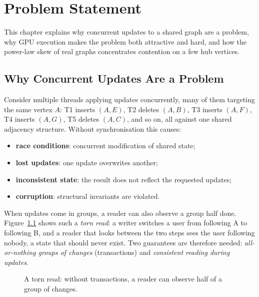 \documentclass[11pt,a4paper,oneside]{report}
\begin{document}
\chapter{Problem Statement}
\label{ch:problem}
This chapter explains why concurrent updates to a shared graph are a problem, why GPU execution makes the problem both
attractive and hard, and how the power-law skew of real graphs concentrates contention on a few hub vertices.

\section{Why Concurrent Updates Are a Problem}
Consider multiple threads applying updates concurrently, many of them targeting the same vertex $A$: T1 inserts $(A,E)$,
T2 deletes $(A,B)$, T3 inserts $(A,F)$, T4 inserts $(A,G)$, T5 deletes $(A,C)$, and so on, all against one shared
adjacency structure. Without synchronisation this causes:
\begin{itemize}
\item \textbf{race conditions}: concurrent modification of shared state;
\item \textbf{lost updates}: one update overwrites another;
\item \textbf{inconsistent state}: the result does not reflect the requested updates;
\item \textbf{corruption}: structural invariants are violated.
\end{itemize}

When updates come in groups, a reader can also observe a group half done. Figure~\ref{fig:torn} shows such a
\emph{torn read}: a writer switches a user from following A to following B, and a reader that looks between the two
steps sees the user following nobody, a state that should never exist. Two guarantees are therefore needed:
\emph{all-or-nothing groups of changes} (transactions) and \emph{consistent reading during updates}.

\begin{figure}[H]
\centering
{}
\caption{A torn read: without transactions, a reader can observe half of a group of changes.}
\label{fig:torn}
\end{figure}
\end{document}
